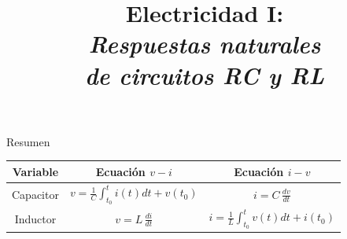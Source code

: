\documentclass[aspectratio=169]{beamer}
\title{
    Electricidad I:\\
    \alert{\emph{Respuestas naturales}}\\
    \alert{\emph{de circuitos RC y RL}}
}
\begin{document}


\begin{frame}{Resumen}
    \begin{center}
        \begin{tabularx}{14cm}{C C C}
        \toprule
        Variable & Ecuación $v-i$ & Ecuación $i-v$ \\
        \midrule
       Capacitor & $v=\frac{1}{C}\int_{t_0}^{t} i(t)dt + v(t_0) $ & $i = C\,\frac{dv}{dt}$ \\[5pt]
        Inductor & $v = L\,\frac{di}{dt}$ & $i=\frac{1}{L}\int_{t_0}^{t} v(t)dt + i(t_0) $\\[5pt]
        \bottomrule
        \end{tabularx}   
    \end{center}
\end{frame}
\end{document}
